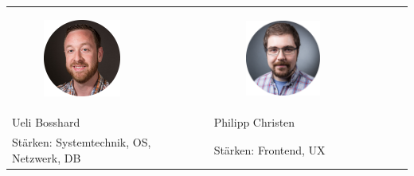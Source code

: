 \begin{tabularx}{\textwidth}{| X | X | }
    \hline
    \begin{minipage}{.5\textwidth}
        \begin{figure}[H]
            \centering
            \includegraphics[width=0.6\textwidth,keepaspectratio]{fig/ubos}
            \label{fig:authors:ubos}
        \end{figure}
    \end{minipage}
	&
	\begin{minipage}{.5\textwidth}
        \begin{figure}[H]
            \centering
            \includegraphics[width=0.6\textwidth,keepaspectratio]{fig/pchr}
            \label{fig:authors:pchr}
        \end{figure}
    \end{minipage} \\
    Ueli Bosshard & Philipp Christen \\
    Stärken: Systemtechnik, OS, Netzwerk, DB
    &
    Stärken: Frontend, UX \\
    \hline
\end{tabularx}

